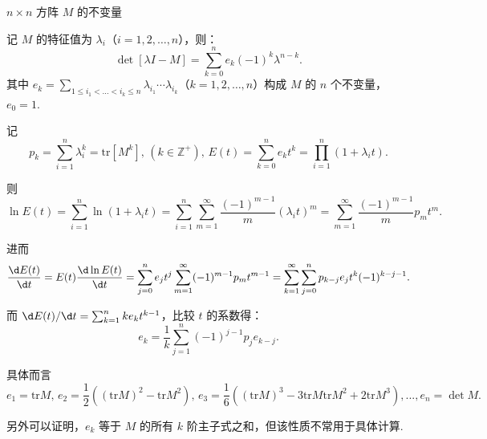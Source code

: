 \begin{notes}
	\(n \times n\) 方阵 \(M\) 的不变量

	记 \(M\) 的特征值为 \(\lambda_i\)（\(i = 1, 2, \dots, n\)），则：
	\begin{equation*}
		\det[\lambda I - M] = \sum_{k=0}^n e_k (-1)^k \lambda^{n-k}.
	\end{equation*}
	其中 \(e_k = \sum_{1 \leq i_1 < \dots < i_k \leq n} \lambda_{i_1} \cdots \lambda_{i_k}\)（\(k = 1, 2, \dots, n\)）构成 \(M\) 的 \(n\) 个不变量，\(e_0 = 1\).

	记
	\begin{equation*}
		p_k = \sum_{i=1}^n \lambda_i^k = \mathrm{tr}[M^k],\,(k \in \mathbb{Z}^+),\,E(t) = \sum_{k=0}^n e_k t^k = \prod_{i=1}^n (1 + \lambda_i t).
	\end{equation*}

	则
	\begin{equation*}
		\ln E(t) = \sum_{i=1}^n \ln(1 + \lambda_i t) = \sum_{i=1}^n \sum_{m=1}^\infty \dfrac{(-1)^{m-1}}{m} (\lambda_i t)^m = \sum_{m=1}^\infty \dfrac{(-1)^{m-1}}{m} p_m t^m.
	\end{equation*}

	进而
	\begin{equation*}
		\dfrac{\d E(t)}{\d t} = E(t) \dfrac{\d \ln E(t)}{\d t} = \sum_{j=0}^n e_j t^j \sum_{m=1}^\infty (-1)^{m-1} p_m t^{m-1} = \sum_{k=1}^\infty \sum_{j=0}^n p_{k-j} e_j t^k (-1)^{k-j-1}.
	\end{equation*}

	而 \(\d E(t)/\d t = \sum_{k=1}^n k e_k t^{k-1}\)，比较 \(t\) 的系数得：
	\begin{equation*}
		e_k = \frac{1}{k}\sum_{j=1}^n (-1)^{j-1} p_j e_{k-j}.
	\end{equation*}

	具体而言
	\begin{equation*}
		e_1 = \mathrm{tr}M,\,e_2 = \dfrac{1}{2}\left( (\mathrm{tr}M)^2 - \mathrm{tr}M^2 \right),\,e_3 = \dfrac{1}{6}\left( (\mathrm{tr}M)^3 - 3 \mathrm{tr}M \mathrm{tr}M^2 + 2 \mathrm{tr}M^3 \right),...,e_n = \det M.
	\end{equation*}

	另外可以证明，\(e_k\) 等于 \(M\) 的所有 \(k\) 阶主子式之和，但该性质不常用于具体计算.

\end{notes}


